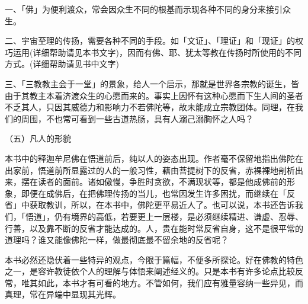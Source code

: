 \documentclass[twoside,openany]{book}
\begin{document}
一、「佛」为便利渡众，常会因众生不同的根基而示现各种不同的身分来接引众生。

二、宇宙至理的传扬，需要各种不同的手段。如「文证」、「理证」和「现证」的权巧运用(详细帮助请见本书文字)，因而有佛、耶、犹太等教在传扬时所使用的不同方式。(详细帮助请见书中文字)

三、「三教教主会于一堂」的景象，给人一个启示，那就是世界各宗教的诞生，皆由于其教主本着济渡众生的心愿而来的。事实上因怀有这种心愿而下生人间的圣者不乏其人，只因其威德力和影响力不若佛陀等，故未能成立宗教团体。同理，在我们的周围，不也常可看到一些古道热肠，具有人溺己溺胸怀之人吗？

（五）凡人的形貌

本书中的释迦牟尼佛在悟道前后，纯以人的姿态出现。作者毫不保留地指出佛陀在出家前，悟道前所显露过的人的一般习性，藉由菩提树下的反省，赤裸裸地剖析出来，摆在读者的面前。诸如傲慢，争胜时贪欲，不满现状等，都是他成佛前的形象，即便在成佛后，在把佛理传扬的当儿，也常因发生许多困扰，而继续在「反省」中获取教训，所以，在本书中，佛陀更平易近人了。也可以说，本书还告诉我们，「悟道」，仍有境界的高低，若要更上一层楼，是必须继续精进、谦虚、忍辱、行善，以及靠不断的反省才能达成的。人，贵在能时常反省自身，这不是很平常的道理吗？谁又能像佛陀一样，做最彻底最不留余地的反省呢？

本书必然还隐伏着一些特异的观点，今限于篇幅，不便多所探论。好在佛教的特色之一，是容许教徒依个人的理解与体悟来阐述经义的。只是本书有许多论点比较反常，唯其如此，本书才有可看的地方。不管如何，我们应有雅量容纳一些异见，而真理，常在异端中显现其光辉。
\end{document}
